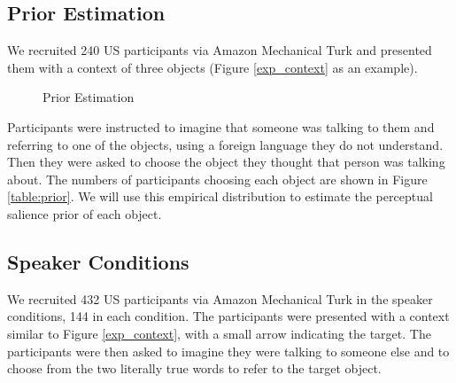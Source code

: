 \subsection{Prior Estimation}
We recruited 240 US participants via Amazon Mechanical Turk and presented them with a context of three objects (Figure \ref{exp_context} as an example).  

\begin{figure}[htb] 
  \centering
  \hspace{5mm}
  \caption{Prior Estimation}
\end{figure}

Participants were instructed to imagine that someone was talking to them and referring to one of the objects, using a foreign language they do not understand. Then they were asked to choose the object they thought that person was talking about. The numbers of participants choosing each object are shown in Figure \ref{table:prior}. We will use this empirical distribution to estimate the perceptual salience prior of each object.

\subsection{Speaker Conditions}

We recruited 432 US participants via Amazon Mechanical Turk in the speaker conditions, 144 in each condition. The participants were presented with a context similar to Figure \ref{exp_context}, with a small arrow indicating the target. The participants were then asked to imagine they were talking to someone else and to choose from the two literally true words to refer to the target object.

